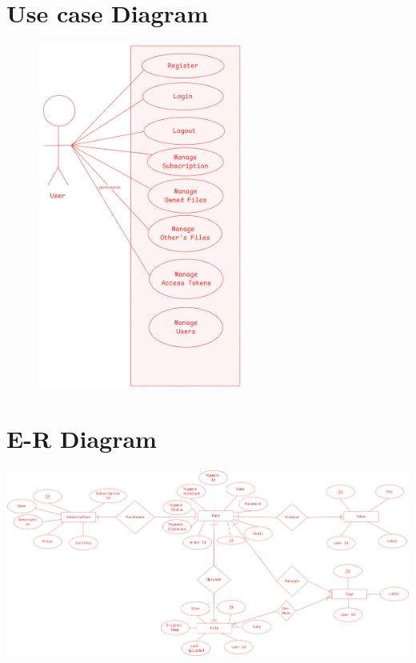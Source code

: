 \documentclass[12pt,a4paper]{report}
\begin{document}
\section{Use case Diagram}\label{sec:use_case_diagram}
\begin{figure}[H]
	\centering
	\includegraphics[width=0.6\textwidth]{use-case.png}
\end{figure}
\section{E-R Diagram}\label{sec:normalisation_and_er_diagram}
\includegraphics[width=\textwidth]{erd.png}
\end{document}
